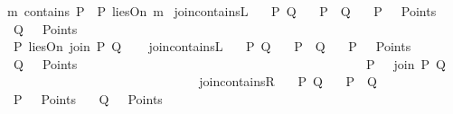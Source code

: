 \begin{isabellebody}
\ \ {\isachardoublequoteopen}m\ contains\ P\ {\isacharequal}{\kern0pt}\ {\isacharparenleft}{\kern0pt}P\ liesOn\ m{\isacharparenright}{\kern0pt}{\isachardoublequoteclose}\isanewline
\isanewline
{}\isamarkupfalse%
\ join{\isacharunderscore}{\kern0pt}containsL{\isacharcolon}{\kern0pt}\isanewline
\ \ \ P\ Q\isanewline
\ \ \ {\isachardoublequoteopen}P\ {\isasymnoteq}\ Q{\isachardoublequoteclose}\isanewline
\ \ \ {\isachardoublequoteopen}P\ \ {\isasymin}\ Points{\isachardoublequoteclose}\isanewline
\ \ \ {\isachardoublequoteopen}Q\ \ {\isasymin}\ Points{\isachardoublequoteclose}\ \ \ \ \ \ \ \ \ \ \ \ \ \ \ \ \ \ \ \ \ \ \ \ \ \ \ \ \ \ \ \ \ \ \ \ \ \ \ \ \ \ \isanewline
\ \ \ {\isachardoublequoteopen}P\ liesOn\ {\isacharparenleft}{\kern0pt}join\ P\ Q{\isacharparenright}{\kern0pt}{\isachardoublequoteclose}\isanewline
%
\isadelimproof
\ \ %
\endisadelimproof
%
\isatagproof
{}\isamarkupfalse%
%
\endisatagproof
{\isafoldproof}%
%
\isadelimproof
\isanewline
%
\endisadelimproof
\isanewline
{}\isamarkupfalse%
\ join{\isacharunderscore}{\kern0pt}containsL{}{\isacharcolon}{\kern0pt}\isanewline
\ \ \ P\ Q\isanewline
\ \ \ {\isachardoublequoteopen}P\ {\isasymnoteq}\ Q{\isachardoublequoteclose}\isanewline
\ \ \ {\isachardoublequoteopen}P\ \ {\isasymin}\ Points{\isachardoublequoteclose}\isanewline
\ \ \ {\isachardoublequoteopen}Q\ \ {\isasymin}\ Points{\isachardoublequoteclose}\ \ \ \ \ \ \ \ \ \ \ \ \ \ \ \ \ \ \ \ \ \ \ \ \ \ \ \ \ \ \ \ \ \ \ \ \ \ \ \ \ \ \isanewline
\ \ \ {\isachardoublequoteopen}P\ {\isasymlhd}\ \ {\isacharparenleft}{\kern0pt}join\ P\ Q{\isacharparenright}{\kern0pt}{\isachardoublequoteclose}\isanewline
%
\isadelimproof
\ \ %
\endisadelimproof
%
\isatagproof
{}\isamarkupfalse%
%
\endisatagproof
{\isafoldproof}%
%
\isadelimproof
\ \ \ \ \ \ \ \ \ \ \ \ \ \ \ \ \ \ \ \ \ \ \ \ \ \ \ \ \isanewline
%
\endisadelimproof
\isanewline
{}\isamarkupfalse%
\ join{\isacharunderscore}{\kern0pt}containsR{\isacharcolon}{\kern0pt}\isanewline
\ \ \ P\ Q\isanewline
\ \ \ {\isachardoublequoteopen}P\ {\isasymnoteq}\ Q{\isachardoublequoteclose}\isanewline
\ \ \ {\isachardoublequoteopen}P\ \ {\isasymin}\ Points{\isachardoublequoteclose}\isanewline
\ \ \ {\isachardoublequoteopen}Q\ \ {\isasymin}\ Points{\isachardoublequoteclose}\ \ \ \ \ \ \ \ \ \ \ \ \ \ \ \ \ \ \ \ \ \ \ \ \ \ \ \ \ \ \ \ \ \ \ \ \ \ \ \ \ \ \isanewline

\end{isabellebody}
